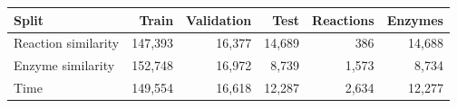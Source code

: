 \begin{tabular}{lrrrrr}
\toprule
Split & Train & Validation & Test & Reactions & Enzymes \\
\midrule
Reaction similarity & 147,393 & 16,377 & 14,689 & 386 & 14,688 \\
Enzyme similarity & 152,748 & 16,972 & 8,739 & 1,573 & 8,734 \\
Time & 149,554 & 16,618 & 12,287 & 2,634 & 12,277 \\
\bottomrule
\end{tabular}
